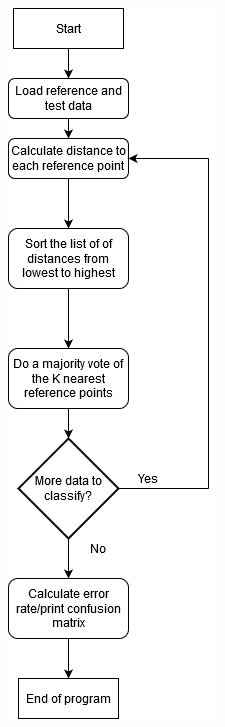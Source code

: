 \documentclass{article}
\begin{document}
\begin{figure}
\centering
\begin{minipage}[t]{.5\textwidth}
  \centering
  \includegraphics[scale=0.6]{flow_KNN.png}
  \label{fig:flow_1}
\end{minipage}%
\begin{minipage}[t]{.5\textwidth}
  \centering

\end{minipage}
\end{figure}
\end{document}
